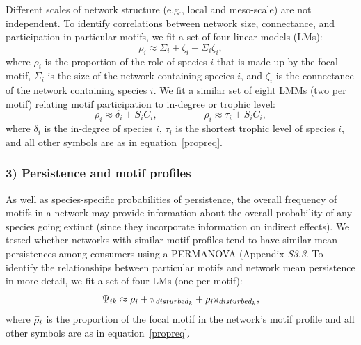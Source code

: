 \documentclass[12pt]{article}
\begin{document}
\begin{spacing}{2.0}
        Different scales of network structure (e.g., local and meso-scale) are not independent. 
        To identify correlations between network size, connectance, and participation in particular motifs, we fit a set of four linear models (LMs):
        \begin{equation}
            \rho_{i} \approx \Sigma_{i} + \zeta_{i} + \Sigma_{i}\zeta_{i} ,
            \label{partic_SC}
        \end{equation}
        \noindent where $\rho_{i}$ is the proportion of the role of species $i$ that is made up by the focal motif,
        $\Sigma_{i}$ is the size of the network containing species $i$, and $\zeta_{i}$ is the connectance of the network containing species $i$.
        We fit a similar set of eight LMMs (two per motif) relating motif participation to in-degree or trophic level:
        \begin{equation}
            \rho_{i} \approx \delta_{i} + S_{i}C_{i} , \hspace{2cm} 
            \rho_{i} \approx \tau_{i} + S_{i}C_{i} ,
            \label{partic_degTL}
        \end{equation}
        \noindent where $\delta_{i}$ is the in-degree of species $i$, $\tau_{i}$ is the shortest trophic level of species $i$, and all other symbols are as in equation~\ref{propreq}.   
        
        
    \subsubsection*{3) Persistence and motif profiles}

        As well as species-specific probabilities of persistence, the overall frequency of motifs in a network may provide information about the overall probability of any species going extinct (since they incorporate information on indirect effects).
        We tested whether networks with similar motif profiles tend to have similar mean persistences among consumers using a PERMANOVA (Appendix \emph{S3.3}.
        To identify the relationships between particular motifs and network mean persistence in more detail, we fit a set of four LMs (one per motif):
            \begin{equation}
                \Psi_{ik} \approx \Bar{\rho}_{i} + \pi_{disturbed_k} + \Bar{\rho}_{i}\pi_{disturbed_k},
                \label{netpropeq}
            \end{equation}
        \noindent where $\Bar{\rho}_{i}$ is the proportion of the focal motif in the network's motif profile and all other symbols are as in equation~\ref{propreq}.
            

\end{spacing}
\end{document}
